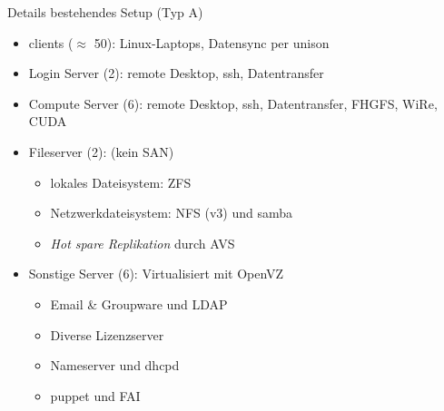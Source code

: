 \documentclass[hyperref={xetex}]{beamer}
\begin{document}
\begin{frame}{Details bestehendes Setup (Typ A)}
	\begin{itemize}
        \item \alert{clients ($\approx$ 50):} Linux-Laptops, Datensync per unison
        \item \alert{Login Server (2):} remote Desktop, ssh, Datentransfer
        \item \alert{Compute Server (6):} remote Desktop, ssh, Datentransfer, FHGFS, WiRe, CUDA
        \item \alert{Fileserver (2):} (kein SAN)
			\begin{itemize}
				\item lokales Dateisystem: ZFS 
				\item Netzwerkdateisystem: NFS (v3) und samba
                \item \textsl{Hot spare Replikation} durch AVS
			\end{itemize} 
        \item <2> \alert{Sonstige Server (6):} Virtualisiert mit OpenVZ
	\begin{itemize}
		\item Email \& Groupware und LDAP
		\item Diverse Lizenzserver
		\item Nameserver und dhcpd
        \item puppet und FAI    
	\end{itemize}
	\end{itemize}
\end{frame}
\end{document}
